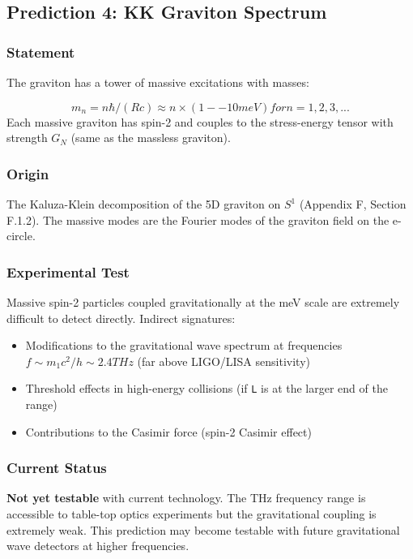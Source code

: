 \documentclass[aps,prd,preprint,superscriptaddress,longbibliography,floatfix]{revtex4-2}
\theoremstyle{remark}
\begin{document}
\subsection{Prediction 4: KK Graviton Spectrum}


\subsubsection{Statement}

The graviton has a tower of massive excitations with masses:


\begin{equation}
    m_n = n\hbar/(Rc) \approx n \times (1--10 meV)    for n = 1, 2, 3, ...
\end{equation}
Each massive graviton has spin-2 and couples to the stress-energy tensor with strength $G_N$ (same as the massless graviton).


\subsubsection{Origin}

The Kaluza-Klein decomposition of the 5D graviton on $S^{1}$ (Appendix F, Section F.1.2). The massive modes are the Fourier modes of the graviton field on the e-circle.


\subsubsection{Experimental Test}

Massive spin-2 particles coupled gravitationally at the meV scale are extremely difficult to detect directly. Indirect signatures:

\begin{itemize}
  \item Modifications to the gravitational wave spectrum at frequencies $f \sim  m_{1}c^{2}/h \sim  2.4 THz$ (far above LIGO/LISA sensitivity)
  \item Threshold effects in high-energy collisions (if \texttt{L} is at the larger end of the range)
  \item Contributions to the Casimir force (spin-2 Casimir effect)
\end{itemize}


\subsubsection{Current Status}

\textbf{Not yet testable} with current technology. The THz frequency range is accessible to table-top optics experiments but the gravitational coupling is extremely weak. This prediction may become testable with future gravitational wave detectors at higher frequencies.
\end{document}
